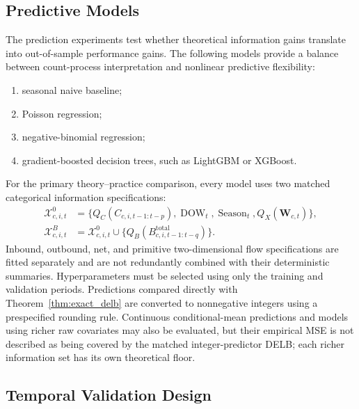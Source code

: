 \documentclass[applsci,article,submit,moreauthors]{Definitions/mdpi}
\begin{document}
\subsection{Predictive Models}
\label{subsec:predictive_models}

The prediction experiments test whether theoretical information gains translate into out-of-sample performance gains. The following models provide a balance between count-process interpretation and nonlinear predictive flexibility:
\begin{enumerate}
    \item seasonal naive baseline;
    \item Poisson regression;
    \item negative-binomial regression;
    \item gradient-boosted decision trees, such as LightGBM or XGBoost.
\end{enumerate}

For the primary theory--practice comparison, every model uses two matched
categorical information specifications:
\begin{align}
\mathcal{X}^{0}_{c,i,t}
&=
\{Q_C(C_{c,i,t-1:t-p}),\operatorname{DOW}_t,
\operatorname{Season}_t,Q_X(\mathbf{W}_{c,t})\},\\
\mathcal{X}^{B}_{c,i,t}
&=
\mathcal{X}^{0}_{c,i,t}
\cup
\{Q_B(B^{\mathrm{total}}_{c,i,t-1:t-q})\}.
\end{align}
Inbound, outbound, net, and primitive two-dimensional flow specifications are
fitted separately and are not redundantly combined with their deterministic
summaries. Hyperparameters must be selected using only the training and
validation periods. Predictions compared directly with
Theorem~\ref{thm:exact_delb} are converted to nonnegative integers using a
prespecified rounding rule. Continuous conditional-mean predictions and
models using richer raw covariates may also be evaluated, but their empirical
MSE is not described as being covered by the matched integer-predictor DELB;
each richer information set has its own theoretical floor.

\subsection{Temporal Validation Design}
\label{subsec:validation}
\end{document}
